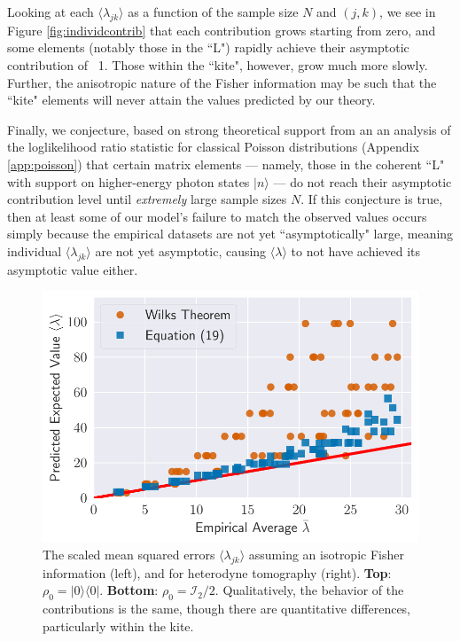 \documentclass[aps,pra, twocolumn]{revtex4}
\begin{document}
Looking at each $\langle \lambda_{jk} \rangle$ as a function of the sample size $N$ and $(j, k)$, we see in Figure \ref{fig:individcontrib} that each contribution grows 
starting from zero, and some elements (notably those in the ``L") rapidly achieve their asymptotic 
contribution of ~1.  Those within the ``kite", however, grow much more slowly. Further, the anisotropic nature of the Fisher information may be such that the ``kite" elements will never attain the values predicted by our theory.

Finally, we conjecture, based on strong theoretical support from an an analysis  of the loglikelihood ratio statistic for classical Poisson distributions (Appendix \ref{app:poisson}) that certain matrix elements --- namely, those in the coherent ``L" with support on higher-energy photon states $|n\rangle$ --- do not reach their asymptotic contribution level until  \emph{extremely} large 
sample sizes $N$.  If this conjecture is true, then at least some of our model's failure to match the observed values occurs 
simply because the empirical datasets are not yet ``asymptotically" large, meaning individual $\langle \lambda_{jk}\rangle$ are not yet asymptotic, causing $\langle \lambda \rangle $ to not have achieved its asymptotic value either.

\begin{figure}[h]
  \includegraphics[width=\columnwidth]{Images/Figure_11.pdf}
 \caption{The scaled mean squared errors $\langle \lambda_{jk} \rangle$ assuming an isotropic Fisher information (left), and for heterodyne tomography (right). \textbf{Top}: $\rho_{0} = |0\rangle\langle 0|$. \textbf{Bottom}: $\rho_{0} = \mathcal{I}_{2}/2$. Qualitatively, the behavior of the contributions is the same, though there are quantitative differences, particularly within the
kite.}
\label{fig:model_comparison}
\end{figure}
\end{document}
